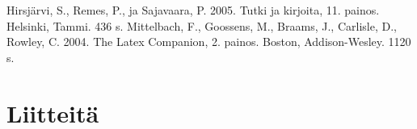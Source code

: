 ﻿\documentclass[12pt,a4paper,finnish]{tutthesis}
\begin{document}
\newpage
{} %
\renewcommand{\bibname}{Lähteet} 
\begin{thebibliography}{99}
 Hirsjärvi, S., Remes, P., ja Sajavaara, P. 2005. Tutki ja
  kirjoita, 11. painos. Helsinki, Tammi. 436 s. 
 Mittelbach, F., Goossens, M., Braams, J., 
Carlisle, D., Rowley, C. 2004. The Latex Companion, 2. painos. Boston, Addison-Wesley. 1120 s.
 
\end{thebibliography}
 
%
%
 
\appendix
\renewcommand{\chaptername}{Liite}
 
\chapter{Liitteitä}
\end{document}
